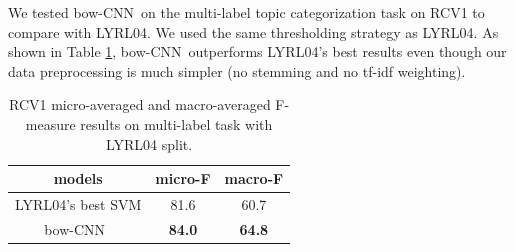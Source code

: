 \documentclass[11pt,letterpaper]{article}
\newcommand{\bcnn}{bow-CNN}
\newcommand{\bow}{{bow}}
\newcommand{\bowone}{{bow1}}
\newcommand{\bx}{{\mathbf x}}
\begin{document}
We tested \bcnn\ on the multi-label topic categorization task on RCV1
to compare with LYRL04.  
%
We used the same thresholding strategy as LYRL04. 
As shown in Table \ref{tab:rcv-multi}, 
\bcnn\ outperforms LYRL04's best results %
even though our data preprocessing is much simpler (no stemming and no tf-idf weighting).  


\begin{table}
\begin{center}
\begin{small}
\begin{tabular}{|c|c|c|} 
\hline
models                         & micro-F & macro-F \\
\hline
LYRL04's best SVM   & 81.6   & 60.7    \\
\hline
\bcnn\                          &{\bf 84.0}&{\bf 64.8}\\ %
\hline
\end{tabular}
\end{small}
\vspace{-0.1in}
\caption{ \label{tab:rcv-multi} \small
RCV1 micro-averaged %
and macro-averaged F-measure results 
on multi-label task with LYRL04 split.   
}
\end{center}
\end{table}
\end{document}

